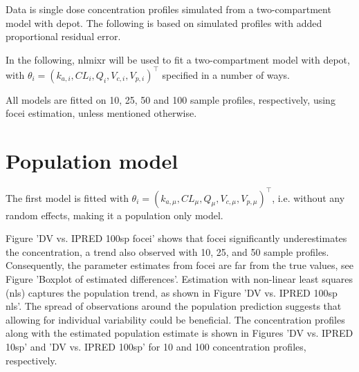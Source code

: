 \begin{table}[h]
    \centering
    \caption{Values data is simulated from}
    \label{table:parameter_estimates}
\end{table}
Data is single dose concentration profiles simulated from a two-compartment model with depot. The following is based on simulated profiles with added proportional residual error. 


In the following, nlmixr will be used to fit a two-compartment model with depot, with $\theta_i=(k_{a,i}, CL_{i}, Q_i,V_{c,i},V_{p,i})^\top$ specified in a number of ways.

All models are fitted on 10, 25, 50 and 100 sample profiles, respectively, using focei estimation, unless mentioned otherwise. 

\section{Population model}
The first model is fitted with $\theta_i=(k_{a,\mu}, CL_{\mu}, Q_{\mu},V_{c,\mu},V_{p,\mu})^\top$, i.e. without any random effects, making it a population only model. 

Figure 'DV vs. IPRED 100sp focei' shows that focei significantly underestimates the concentration, a trend also observed with 10, 25, and 50 sample profiles. Consequently, the parameter estimates from focei are far from the true values, see Figure 'Boxplot of estimated differences'. Estimation with non-linear least squares (nls) captures the population trend, as shown in Figure 'DV vs. IPRED 100sp nls'. The spread of observations around the population prediction suggests that allowing for individual variability could be beneficial. The concentration profiles along with the estimated population estimate is shown in Figures 'DV vs. IPRED 10sp' and 'DV vs. IPRED 100sp' for 10 and 100 concentration profiles, respectively.

